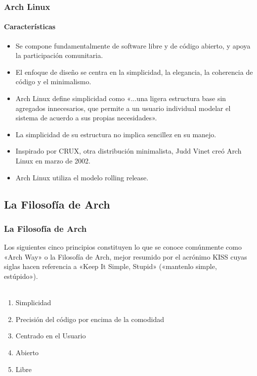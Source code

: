 \documentclass[9pt,t]{beamer}
\begin{document}
\begin{frame}\justifying
  \frametitle{Arch Linux}
  \framesubtitle{Características}
    \begin{itemize}\justifying
      \item Se compone fundamentalmente de software libre y de código abierto, y apoya la participación comunitaria.
      \item El enfoque de diseño se centra en la simplicidad, la elegancia, la coherencia de código y el minimalismo. 
      \item Arch Linux define simplicidad como «...una ligera estructura base sin agregados innecesarios, que permite 
      		a un usuario individual modelar el sistema de acuerdo a sus propias necesidades». 
      \item La simplicidad de su estructura no implica sencillez en su manejo.
      \item Inspirado por CRUX, otra distribución minimalista, Judd Vinet creó Arch Linux en marzo de 2002.
      \item Arch Linux utiliza el modelo rolling release.
   \end{itemize}
\end{frame}


\subsection{La Filosofía de Arch}
\begin{frame}\justifying
  \frametitle{La Filosofía de Arch}
    Los siguientes cinco principios constituyen lo que se conoce comúnmente como «Arch Way» o la Filosofía 
    de Arch, mejor resumido por el acrónimo KISS cuyas siglas hacen referencia a «Keep It Simple, 
    Stupid» («mantenlo simple, estúpido»). 
	\ \\ \ \\
    \begin{enumerate}\justifying
      \item Simplicidad
      \item Precisión del código por encima de la comodidad
      \item Centrado en el Usuario
      \item Abierto
      \item Libre
   \end{enumerate}
\end{frame}
\end{document}

